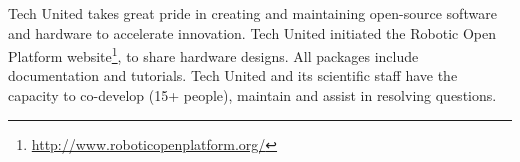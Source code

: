Tech United takes great pride in creating and maintaining open-source software and hardware to accelerate innovation. Tech United initiated the Robotic Open Platform website\footnote{\url{http://www.roboticopenplatform.org/}}, to share hardware designs. All packages include documentation and tutorials. Tech United and its scientific staff have the capacity to co-develop (15+ people), maintain and assist in resolving questions. 